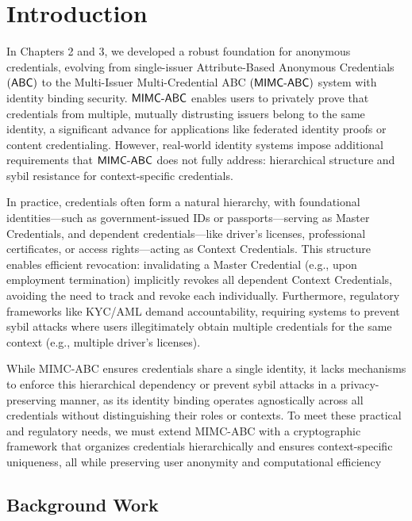 
\section{Introduction}

In Chapters 2 and 3, we developed a robust foundation for anonymous credentials, evolving from single-issuer Attribute-Based Anonymous Credentials $(\mathsf{ABC})$ to the Multi-Issuer Multi-Credential ABC $(\mathsf{MIMC\text{-}ABC})$ system with identity binding security. $\mathsf{MIMC\text{-}ABC}$ enables users to privately prove that credentials from multiple, mutually distrusting issuers belong to the same identity, a significant advance for applications like federated identity proofs or content credentialing. However, real-world identity systems impose additional requirements that $\mathsf{MIMC\text{-}ABC}$ does not fully address: hierarchical structure and sybil resistance for context-specific credentials.

In practice, credentials often form a natural hierarchy, with foundational identities—such as government-issued IDs or passports—serving as Master Credentials, and dependent credentials—like driver’s licenses, professional certificates, or access rights—acting as Context Credentials. This structure enables efficient revocation: invalidating a Master Credential (e.g., upon employment termination) implicitly revokes all dependent Context Credentials, avoiding the need to track and revoke each individually. Furthermore, regulatory frameworks like KYC/AML demand accountability, requiring systems to prevent sybil attacks where users illegitimately obtain multiple credentials for the same context (e.g., multiple driver’s licenses). 

While MIMC-ABC ensures credentials share a single identity, it lacks mechanisms to enforce this hierarchical dependency or prevent sybil attacks in a privacy-preserving manner, as its identity binding operates agnostically across all credentials without distinguishing their roles or contexts. To meet these practical and regulatory needs, we must extend MIMC-ABC with a cryptographic framework that organizes credentials hierarchically and ensures context-specific uniqueness, all while preserving user anonymity and computational efficiency


\subsection{Background Work}

